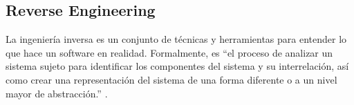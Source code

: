 
\subsection{Reverse Engineering}

La ingeniería inversa es un conjunto de técnicas y herramientas para entender lo que hace un software en realidad. Formalmente, es ``el proceso de analizar un sistema sujeto para identificar los componentes del sistema y su interrelación, así como crear una representación del sistema de una forma diferente o a un nivel mayor de abstracción.'' \cite{Eld}.
